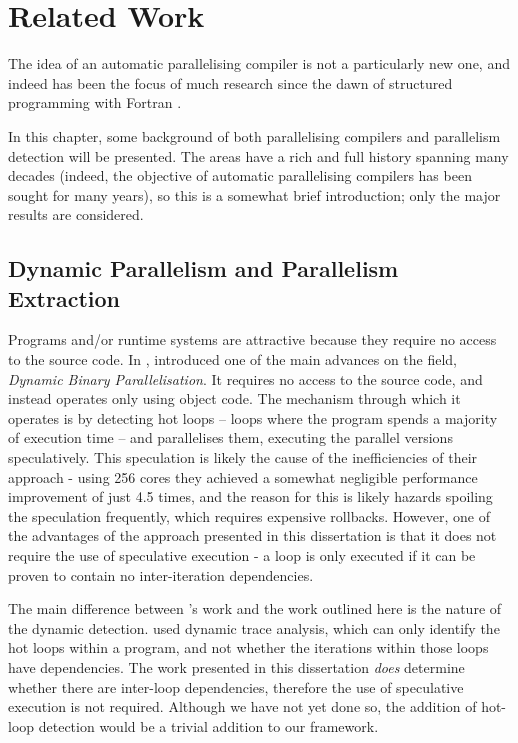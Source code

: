 \chapter{Related Work} \label{chp:related}
The idea of an automatic parallelising compiler is not a particularly new one, and indeed has been the focus of much research since the dawn of structured programming with Fortran \citep{Backus1979}.

In this chapter, some background of both parallelising compilers and parallelism detection will be presented. The areas have a rich and full history spanning many decades (indeed, the objective of automatic parallelising compilers has been sought for many years), so this is a somewhat brief introduction; only the major results are considered.

\section{Dynamic Parallelism and Parallelism Extraction} \label{sec:related/compilers}
Programs and/or runtime systems are attractive because they require no access to the source code. In \citeyear{Yang2011}, \citet{Yang2011} introduced one of the main advances on the field, \textit{Dynamic Binary Parallelisation}. It requires no access to the source code, and instead operates only using object code. The mechanism through which it operates is by detecting hot loops -- loops where the program spends a majority of execution time -- and parallelises them, executing the parallel versions speculatively. This speculation is likely the cause of the inefficiencies of their approach - using 256 cores they achieved a somewhat negligible performance improvement of just 4.5 times, and the reason for this is likely hazards spoiling the speculation frequently, which requires expensive rollbacks. However, one of the advantages of the approach presented in this dissertation is that it does not require the use of speculative execution - a loop is only executed if it can be proven to contain no inter-iteration dependencies.

The main difference between \citeauthor{Yang2011}'s work and the work outlined here is the nature of the dynamic detection. \citeauthor{Yang2011} used dynamic trace analysis, which can only identify the hot loops within a program, and not whether the iterations within those loops have dependencies. The work presented in this dissertation \emph{does} determine whether there are inter-loop dependencies, therefore the use of speculative execution is not required. Although we have not yet done so, the addition of hot-loop detection would be a trivial addition to our framework.

